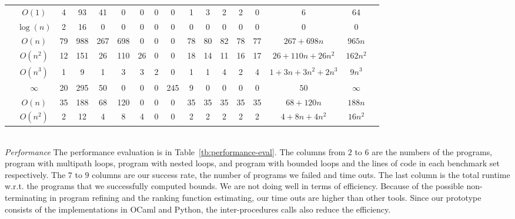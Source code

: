 \begin{table}[ht]
{\begin{tabular}{ >{\scriptsize}c | >{\scriptsize}c | >{\scriptsize}c | >{\scriptsize}c | >{\scriptsize}c | c | c | c | c | c | c | c | c | c | c | c | c |}
 \hline \hline
 \multirow{6}{*}{Icra} 
 & $O(1)$ & 4 & 93 & 41 & 0 & 0 & 0 & 0  & 1 & 3 & 2 & 2 & 0 & 6 & 64 \\
 \cline{2-2}
 & $\log(n)$ & 2 & 16 & 0 & 0 & 0 & 0 & 0  & 0 & 0 & 0 & 0 & 0 & 0 & 0 \\
 \cline{2-2}
 & $O(n)$ & 79 & 988 & 267 & 698 & 0 & 0 & 0  & 78 & 80 & 82 & 78 & 77 & $267 + 698n$ & $ 965n $\\
 \cline{2-2}
 & $O(n^2)$ & 12 & 151 & 26 & 110 & 26 & 0 & 0  & 18 & 14 & 11 & 16 & 17 & $26+110n+26n^2$ & $162n^2$\\
 \cline{2-2}
 & $O(n^3)$ & 1 &  9 & 1 & 3 & 3 & 2 & 0  & 1 & 1 & 4 & 2 & 4 & $1+3n+3n^2+2n^3$ & $9n^3$\\
 \cline{2-2}
 & $\infty$ & 20 & 295 &  50 & 0 & 0 & 0  & 245 & 9 & 0 & 0 & 0 & 0 & $50$ & $ \infty$\\
 \hline \hline
 \multirow{2}{*}{Tianhan} 
 & $O(n)$ & 35 & 188 & 68 & 120 & 0 & 0 &  0 & 35 & 35 & 35 & 35 & 35 & $68+120n$ & $188n$\\
 \cline{2-2}
 & $O(n^2)$ & 2 & 12 & 4 & 8 & 4 & 0 & 0 & 2 & 2 & 2 & 2 & 2 & $4+8n+4n^2$ & $16n^2$ \\
 \hline
 \end{tabular}
 }
 \end{table}
%
\\
\emph{Performance}
The performance evaluation is in Table~\ref{tb:performance-eval}.
The columns from $2$ to $6$ are the numbers of the programs, program with multipath loops, program with nested loops, and program with bounded loops and the lines of code in each benchmark set respectively.
The $7$ to $9$ columns are our success rate, the number of programs we failed and time outs. The last column is the total runtime w.r.t. the programs that we successfully computed bounds.
We are not doing well in terms of efficiency. Because of the possible non-terminating in program refining and the ranking function estimating, our time outs are higher than other tools.
Since our prototype consists of the implementations in OCaml and Python, the inter-procedures calls also reduce the efficiency.
%
%
